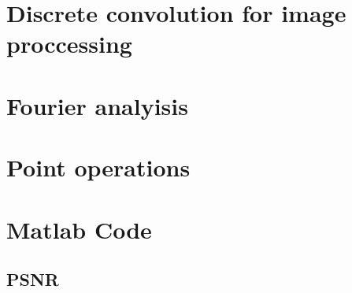 \documentclass[article, 1.5space, letterpaper, 12pt, oneside, header, footer]{SydeClass}
\begin{document}
\section{Discrete convolution for image proccessing}

\section{Fourier analyisis}

\section{Point operations}

\appendix
\newpage

\section{Matlab Code}
\subsection{PSNR}
\label{code-PSNR}




\end{document}
